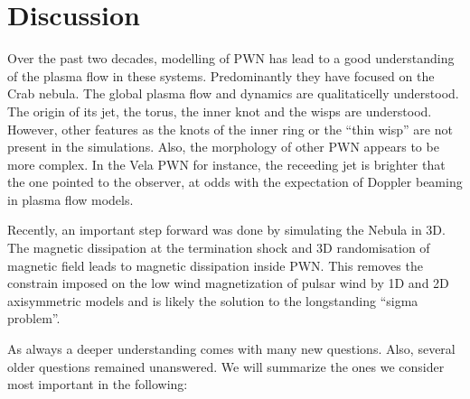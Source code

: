 \section{Discussion}
\label{sec:discussion}

Over the past two decades, modelling of PWN has lead to a good understanding of the plasma flow in these systems. Predominantly they have focused on the Crab nebula.  The global plasma flow and dynamics are qualitaticelly understood. The origin of its jet, the torus, the inner knot and the wisps are understood. However, other features as the knots of the inner ring or the ``thin wisp'' \cite{Hester_1995} are not present in the simulations. Also, the morphology of other PWN appears to be more complex. In the Vela PWN for instance, the receeding jet is brighter that the one pointed to the observer, at odds with the expectation of Doppler beaming in plasma flow models.

Recently, an important step forward was done by simulating the Nebula in 3D. The magnetic dissipation at the termination shock and 3D randomisation of magnetic field leads to magnetic dissipation  inside PWN. This removes the constrain imposed on the low wind magnetization of pulsar wind by 1D and 2D axisymmetric models and is likely the solution to the longstanding ``sigma problem''.

As always a deeper understanding comes with many new questions. Also, several older questions remained unanswered. We will summarize the ones we consider most important in the following: 

